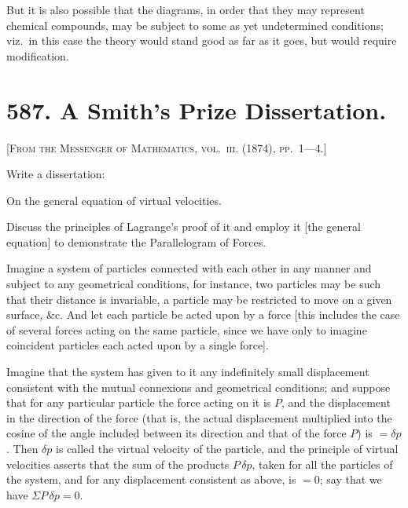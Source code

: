 \documentclass[11pt,a4paper]{book}
\begin{document}
But it is also possible that the diagrams, in order that they may represent chemical compounds, may be subject to some as yet undetermined conditions; viz.\ in this case the theory would stand good as far as it goes, but would require modification.

\newpage

\section*{587. A Smith's Prize Dissertation.}

\noindent\textsc{[From the Messenger of Mathematics, vol.~\textsc{iii}. (1874), pp.~1---4.]}

\medskip

\noindent Write a dissertation:

\smallskip

On the general equation of virtual velocities.

Discuss the principles of Lagrange's proof of it and employ it [the general equation] to demonstrate the Parallelogram of Forces.

\medskip

Imagine a system of particles connected with each other in any manner and subject to any geometrical conditions, for instance, two particles may be such that their distance is invariable, a particle may be restricted to move on a given surface, \&c. And let each particle be acted upon by a force [this includes the case of several forces acting on the same particle, since we have only to imagine coincident particles each acted upon by a single force].

Imagine that the system has given to it any indefinitely small displacement consistent with the mutual connexions and geometrical conditions; and suppose that for any particular particle the force acting on it is $P$, and the displacement in the direction of the force (that is, the actual displacement multiplied into the cosine of the angle included between its direction and that of the force $P$) is $=\delta p$. Then $\delta p$ is called the virtual velocity of the particle, and the principle of virtual velocities asserts that the sum of the products $P\,\delta p$, taken for all the particles of the system, and for any displacement consistent as above, is $=0$; say that we have $\Sigma P\,\delta p = 0$.
\end{document}

